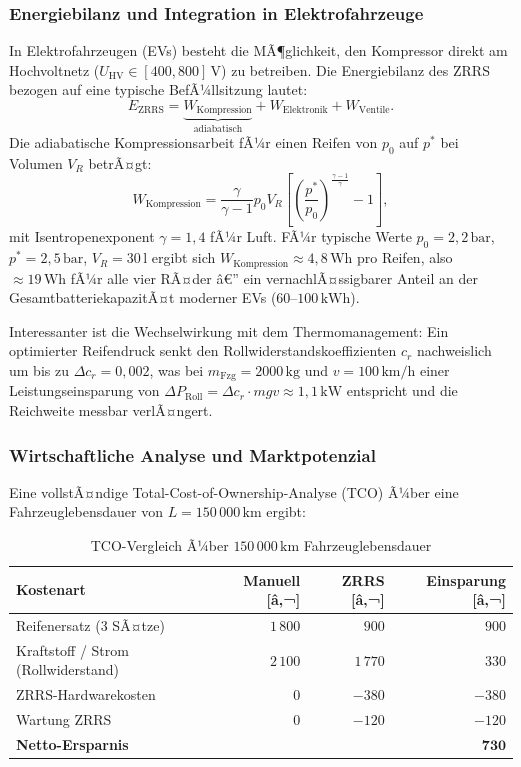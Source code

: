 ﻿\documentclass[a4paper,12pt]{article}
\theoremstyle{definition}
\begin{document}
\subsubsection{Energiebilanz und Integration in Elektrofahrzeuge}

In Elektrofahrzeugen (EVs) besteht die MÃ¶glichkeit, den Kompressor direkt
am Hochvoltnetz ($U_{\text{HV}} \in [400, 800]\,\text{V}$) zu betreiben.
Die Energiebilanz des ZRRS bezogen auf eine typische BefÃ¼llsitzung lautet:
\[
    E_{\text{ZRRS}} = \underbrace{W_{\text{Kompression}}}_{\text{adiabatisch}}
    + W_{\text{Elektronik}} + W_{\text{Ventile}}.
\]
Die adiabatische Kompressionsarbeit fÃ¼r einen Reifen von $p_0$ auf $p^*$ bei
Volumen $V_R$ betrÃ¤gt:
\[
    W_{\text{Kompression}}
    = \frac{\gamma}{\gamma - 1} p_0 V_R
    \left[\left(\frac{p^*}{p_0}\right)^{\!\frac{\gamma-1}{\gamma}} - 1\right],
\]
mit Isentropenexponent $\gamma = 1{,}4$ fÃ¼r Luft. FÃ¼r typische Werte
$p_0 = 2{,}2\,\text{bar}$, $p^* = 2{,}5\,\text{bar}$, $V_R = 30\,\text{l}$ ergibt
sich $W_{\text{Kompression}} \approx 4{,}8\,\text{Wh}$ pro Reifen, also
$\approx 19\,\text{Wh}$ fÃ¼r alle vier RÃ¤der â€” ein vernachlÃ¤ssigbarer Anteil
an der GesamtbatteriekapazitÃ¤t moderner EVs ($60$--$100\,\text{kWh}$).

Interessanter ist die Wechselwirkung mit dem Thermomanagement: Ein
optimierter Reifendruck senkt den Rollwiderstandskoeffizienten $c_r$ nachweislich
um bis zu $\Delta c_r = 0{,}002$, was bei $m_{\text{Fzg}} = 2000\,\text{kg}$ und
$v = 100\,\text{km/h}$ einer Leistungseinsparung von
$\Delta P_{\text{Roll}} = \Delta c_r \cdot m g v \approx 1{,}1\,\text{kW}$ entspricht
und die Reichweite messbar verlÃ¤ngert.

\subsubsection{Wirtschaftliche Analyse und Marktpotenzial}

Eine vollstÃ¤ndige Total-Cost-of-Ownership-Analyse (TCO) Ã¼ber eine
Fahrzeuglebensdauer von $L = 150\,000\,\text{km}$ ergibt:

\begin{table}[H]
\centering
\caption{TCO-Vergleich Ã¼ber $150\,000\,\text{km}$ Fahrzeuglebensdauer}
\label{tab:tco}
\begin{tabular}{lrrr}
\toprule
\textbf{Kostenart} & \textbf{Manuell [â‚¬]} & \textbf{ZRRS [â‚¬]} & \textbf{Einsparung [â‚¬]} \\
\midrule
Reifenersatz (3 SÃ¤tze) & $1\,800$ & $900$ & $900$ \\
Kraftstoff / Strom (Rollwiderstand) & $2\,100$ & $1\,770$ & $330$ \\
ZRRS-Hardwarekosten & $0$ & $-380$ & $-380$ \\
Wartung ZRRS & $0$ & $-120$ & $-120$ \\
\midrule
\textbf{Netto-Ersparnis} & & & $\mathbf{730}$ \\
\bottomrule
\end{tabular}
\end{table}
\end{document}
